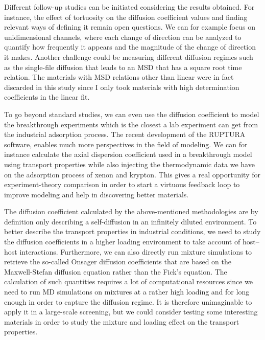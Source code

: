 \documentclass[main]{subfiles}
\begin{document}
Different follow-up studies can be initiated considering the results obtained. For instance, the effect of tortuosity on the diffusion coefficient values and finding relevant ways of defining it remain open questions. We can for example focus on unidimensional channels, where each change of direction can be analyzed to quantify how frequently it appears and the magnitude of the change of direction it makes.\autocite{Bullitt_2003} Another challenge could be measuring different diffusion regimes such as the single-file diffusion that leads to an MSD that has a square root time relation\autocite{Lin_2005}. The materials with MSD relations other than linear were in fact discarded in this study since I only took materials with high determination coefficients in the linear fit. 

To go beyond standard studies, we can even use the diffusion coefficient to model the breakthrough experiments which is the closest a lab experiment can get from the industrial adsorption process. The recent development of the RUPTURA software,\autocite{Sharma_2023} enables much more perspectives in the field of modeling. We can for instance calculate the axial dispersion coefficient used in a breakthrough model using transport properties while also injecting the thermodynamic data we have on the adsorption process of xenon and krypton. This gives a real opportunity for experiment-theory comparison in order to start a virtuous feedback loop to improve modeling and help in discovering better materials. 

The diffusion coefficient calculated by the above-mentioned methodologies are by definition only describing a self-diffusion in an infinitely diluted environment. To better describe the transport properties in industrial conditions, we need to study the diffusion coefficients in a higher loading environment to take account of host--host interactions. Furthermore, we can also directly run mixture simulations to retrieve the so-called Onsager diffusion coefficients that are based on the Maxwell-Stefan diffusion equation rather than the Fick's equation.\autocite{Krishna_2008} The calculation of such quantities requires a lot of computational resources since we need to run MD simulations on mixtures at a rather high loading and for long enough in order to capture the diffusion regime. It is therefore unimaginable to apply it in a large-scale screening, but we could consider testing some interesting materials in order to study the mixture and loading effect on the transport properties.
\end{document}
